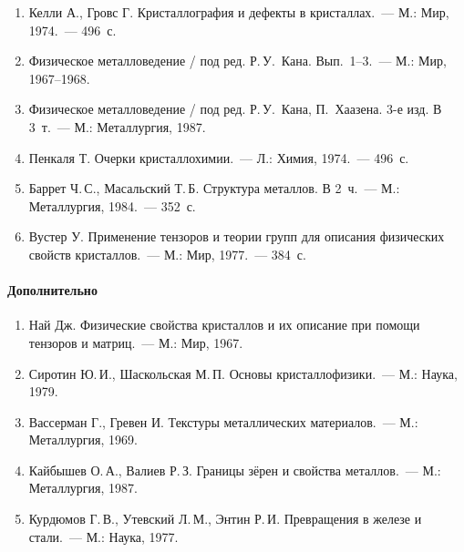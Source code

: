 {\begin{enumerate}[label=\arabic*.]
металлах.~— М.: Металлургия, 1980.~— 156~с.
\item Келли А., Гровс Г. Кристаллография и дефекты в кристаллах.~— М.:
Мир, 1974.~— 496~с.
\item Физическое металловедение / под ред. Р.\,У.~Кана. Вып.~1--3.~— М.:
Мир, 1967--1968.
\item Физическое металловедение / под ред. Р.\,У.~Кана, П.~Хаазена. 3-е
изд. В 3~т.~— М.: Металлургия, 1987.
\item Пенкаля Т. Очерки кристаллохимии.~— Л.: Химия, 1974.~— 496~с.
\item Баррет Ч.\,С., Масальский Т.\,Б. Структура металлов. В 2~ч.~— М.:
Металлургия, 1984.~— 352~с.
\item Вустер У. Применение тензоров и теории групп для описания
физических свойств кристаллов.~— М.: Мир, 1977.~— 384~с.
\end{enumerate}

\paragraph{Дополнительно}
\begin{enumerate}[label=\arabic*., resume]
\item Най Дж. Физические свойства кристаллов и их описание при помощи
тензоров и матриц.~— М.: Мир, 1967.
\item Сиротин Ю.\,И., Шаскольская М.\,П. Основы кристаллофизики.~— М.:
Наука, 1979.
\item Вассерман Г., Гревен И. Текстуры металлических материалов.~— М.:
Металлургия, 1969.
\item Кайбышев О.\,А., Валиев Р.\,З. Границы зёрен и свойства металлов.~—
М.: Металлургия, 1987.
\item Курдюмов Г.\,В., Утевский Л.\,М., Энтин Р.\,И. Превращения в железе и
стали.~— М.: Наука, 1977.
\end{enumerate}
}
